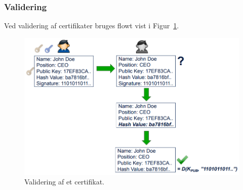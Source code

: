 \subsubsection{Validering}
Ved validering af certifikater bruges flowt vist i Figur~\ref{fig:cert-validate}.

\begin{figure}[H]
	\centering
	\includegraphics[width=0.9\linewidth]{figs/spm4/cert-validate}
	\caption{Validering af et certifikat.}
	\label{fig:cert-validate}
\end{figure}

